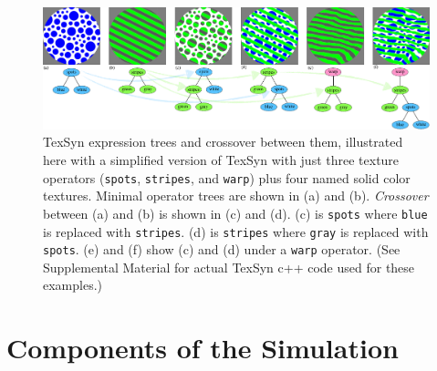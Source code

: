 \documentclass[letterpaper]{article}
\newcommand{\texsyn}[0]{TexSyn}
\newcommand{\stt}[1]{{\small \texttt{#1}}}
\begin{document}
\begin{figure}
    \includegraphics[width=\textwidth]{texsyn_overview.pdf}
    \caption{\texsyn{} expression trees and crossover between them, illustrated here with a simplified version of \texsyn{} with just three texture operators (\stt{spots}, \stt{stripes}, and \stt{warp}) plus four named solid color textures. Minimal operator trees are shown in (a) and (b). \textit{Crossover} between (a) and (b) is shown in (c) and (d). (c) is \stt{spots} where \stt{blue} is replaced with \stt{stripes}. (d) is \stt{stripes} where \stt{gray} is replaced with \stt{spots}. (e) and (f) show (c) and (d) under a \texttt{warp} operator. (See Supplemental Material for actual \texsyn{} c++ code used for these examples.)}
    \label{fig:TexSyn_overview}
\end{figure}



\section{Components of the Simulation}
\end{document}
